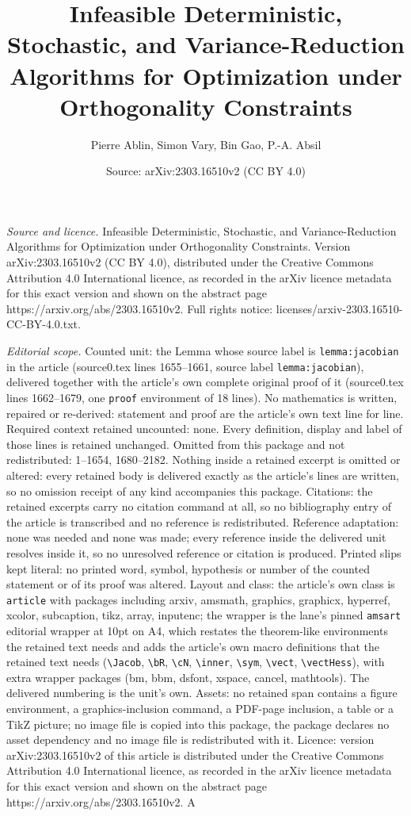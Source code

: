 \documentclass[10pt,a4paper]{amsart}
\title[Infeasible Deterministic, Stochastic, and Variance-Reduction]{Infeasible Deterministic, Stochastic, and Variance-Reduction Algorithms for Optimization under Orthogonality Constraints}
\author{Pierre Ablin, Simon Vary, Bin Gao, P.-A. Absil}
\date{Source: arXiv:2303.16510v2 (CC BY 4.0)}
\begin{document}
\maketitle

\noindent\emph{Source and licence.} Infeasible Deterministic, Stochastic, and Variance-Reduction Algorithms for Optimization under Orthogonality Constraints. Version arXiv:2303.16510v2 (CC BY 4.0), distributed under the Creative Commons Attribution 4.0 International licence, as recorded in the arXiv licence metadata for this exact version and shown on the abstract page https://arxiv.org/abs/2303.16510v2. Full rights notice: licenses/arxiv-2303.16510-CC-BY-4.0.txt.\par\smallskip

\noindent\textit{Editorial scope.} Counted unit: the Lemma whose source label is \texttt{lemma:jacobian} in the article (source0.tex lines 1655--1661, source label \texttt{lemma:jacobian}), delivered together with the article's own complete original proof of it (source0.tex lines 1662--1679, one \texttt{proof} environment of 18 lines). No mathematics is written, repaired or re-derived: statement and proof are the article's own text line for line. Required context retained uncounted: none. Every definition, display and label of those lines is retained unchanged. Omitted from this package and not redistributed: 1--1654, 1680--2182. Nothing inside a retained excerpt is omitted or altered: every retained body is delivered exactly as the article's lines are written, so no omission receipt of any kind accompanies this package. Citations: the retained excerpts carry no citation command at all, so no bibliography entry of the article is transcribed and no reference is redistributed. Reference adaptation: none was needed and none was made; every reference inside the delivered unit resolves inside it, so no unresolved reference or citation is produced. Printed slips kept literal: no printed word, symbol, hypothesis or number of the counted statement or of its proof was altered. Layout and class: the article's own class is \texttt{article} with packages including arxiv, amsmath, graphics, graphicx, hyperref, xcolor, subcaption, tikz, array, inputenc; the wrapper is the lane's pinned \texttt{amsart} editorial wrapper at 10pt on A4, which restates the theorem-like environments the retained text needs and adds the article's own macro definitions that the retained text needs (\texttt{\textbackslash Jacob}, \texttt{\textbackslash bR}, \texttt{\textbackslash cN}, \texttt{\textbackslash inner}, \texttt{\textbackslash sym}, \texttt{\textbackslash vect}, \texttt{\textbackslash vectHess}), with extra wrapper packages (bm, bbm, dsfont, xspace, cancel, mathtools). The delivered numbering is the unit's own. Assets: no retained span contains a figure environment, a graphics-inclusion command, a PDF-page inclusion, a table or a TikZ picture; no image file is copied into this package, the package declares no asset dependency and no image file is redistributed with it. Licence: version arXiv:2303.16510v2 of this article is distributed under the Creative Commons Attribution 4.0 International licence, as recorded in the arXiv licence metadata for this exact version and shown on the abstract page https://arxiv.org/abs/2303.16510v2. A 
\end{document}
